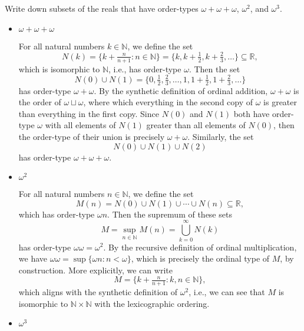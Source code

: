 \documentclass[12pt]{article}
\newenvironment{pbox}
    {\begin{lrbox}{\mybox}\begin{minipage}{0.98\textwidth}}
    {\end{minipage}\end{lrbox}\begin{center}\framebox[\textwidth]{\usebox{\mybox}}\end{center}}
\theoremstyle{definition}
\newcommand{\N}{\mathbb{N}}
\newcommand{\R}{\mathbb{R}}
\begin{document}
\section{}
\begin{pbox}
    Write down subsets of the reals that have order-types $\omega + \omega + \omega$, $\omega^2$, and $\omega^3$.
\end{pbox}

\begin{itemize}
    \item $\omega + \omega + \omega$
    
    For all natural numbers $k \in \N$, we define the set
    \[
        N(k) = \{k + \tfrac{n}{n+1} : n \in \N\} = \{k, k + \tfrac12, k + \tfrac23, \dots\} \subseteq \R,
    \]
    which is isomorphic to $\N$, i.e., has order-type $\omega$. Then the set
    \[
        N(0) \cup N(1) = \{0, \tfrac12, \tfrac23, \dots, 1, 1 + \tfrac12, 1 + \tfrac23, \dots\}
    \]
    has order-type $\omega + \omega$. By the synthetic definition of ordinal addition, $\omega + \omega$ is the order of $\omega \sqcup \omega$, where which everything in the second copy of $\omega$ is greater than everything in the first copy. Since $N(0)$ and $N(1)$ both have order-type $\omega$ with all elements of $N(1)$ greater than all elements of $N(0)$, then the order-type of their union is precisely $\omega + \omega$. Similarly, the set
    \[
        N(0) \cup N(1) \cup N(2)
    \]
    has order-type $\omega + \omega + \omega$.
    
    \item $\omega^2$
    
    For all natural numbers $n \in \N$, we define the set
    \[
        M(n) = N(0) \cup N(1) \cup \cdots \cup N(n) \subseteq \R,
    \]
    which has order-type $\omega n$. Then the supremum of these sets
    \[
        M = \sup_{n \in \N} M(n) = \bigcup_{k = 0}^\infty N(k)
    \]
    has order-type $\omega\omega = \omega^2$. By the recursive definition of ordinal multiplication, we have $\omega\omega = \sup\{\omega n : n < \omega\}$, which is precisely the ordinal type of $M$, by construction. More explicitly, we can write
    \[
        M = \{k + \tfrac{n}{n+1} : k, n \in \N\},
    \]
    which aligns with the synthetic definition of $\omega^2$, i.e., we can see that $M$ is isomorphic to $\N \times \N$ with the lexicographic ordering.
    
    \item $\omega^3$
    

\end{itemize}
\end{document}
